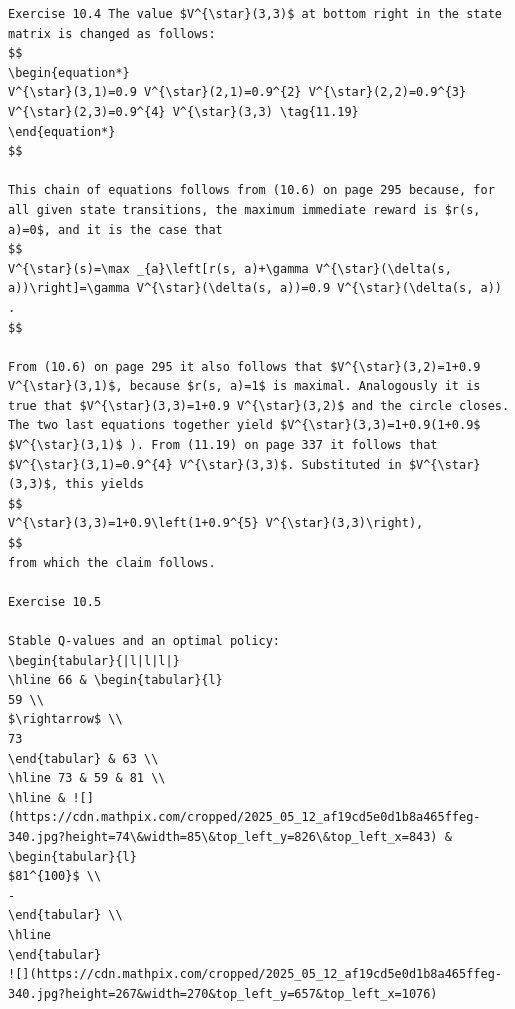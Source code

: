 \documentclass[10pt]{book}
\begin{document}
\begin{verbatim}
Exercise 10.4 The value $V^{\star}(3,3)$ at bottom right in the state matrix is changed as follows:
$$
\begin{equation*}
V^{\star}(3,1)=0.9 V^{\star}(2,1)=0.9^{2} V^{\star}(2,2)=0.9^{3} V^{\star}(2,3)=0.9^{4} V^{\star}(3,3) \tag{11.19}
\end{equation*}
$$

This chain of equations follows from (10.6) on page 295 because, for all given state transitions, the maximum immediate reward is $r(s, a)=0$, and it is the case that
$$
V^{\star}(s)=\max _{a}\left[r(s, a)+\gamma V^{\star}(\delta(s, a))\right]=\gamma V^{\star}(\delta(s, a))=0.9 V^{\star}(\delta(s, a)) .
$$

From (10.6) on page 295 it also follows that $V^{\star}(3,2)=1+0.9 V^{\star}(3,1)$, because $r(s, a)=1$ is maximal. Analogously it is true that $V^{\star}(3,3)=1+0.9 V^{\star}(3,2)$ and the circle closes. The two last equations together yield $V^{\star}(3,3)=1+0.9(1+0.9$ $V^{\star}(3,1)$ ). From (11.19) on page 337 it follows that $V^{\star}(3,1)=0.9^{4} V^{\star}(3,3)$. Substituted in $V^{\star}(3,3)$, this yields
$$
V^{\star}(3,3)=1+0.9\left(1+0.9^{5} V^{\star}(3,3)\right),
$$
from which the claim follows.

Exercise 10.5

Stable Q-values and an optimal policy:
\begin{tabular}{|l|l|l|}
\hline 66 & \begin{tabular}{l}
59 \\
$\rightarrow$ \\
73
\end{tabular} & 63 \\
\hline 73 & 59 & 81 \\
\hline & ![](https://cdn.mathpix.com/cropped/2025_05_12_af19cd5e0d1b8a465ffeg-340.jpg?height=74\&width=85\&top_left_y=826\&top_left_x=843) & \begin{tabular}{l}
$81^{100}$ \\
-
\end{tabular} \\
\hline
\end{tabular}
![](https://cdn.mathpix.com/cropped/2025_05_12_af19cd5e0d1b8a465ffeg-340.jpg?height=267&width=270&top_left_y=657&top_left_x=1076)


\end{verbatim}
\end{document}
